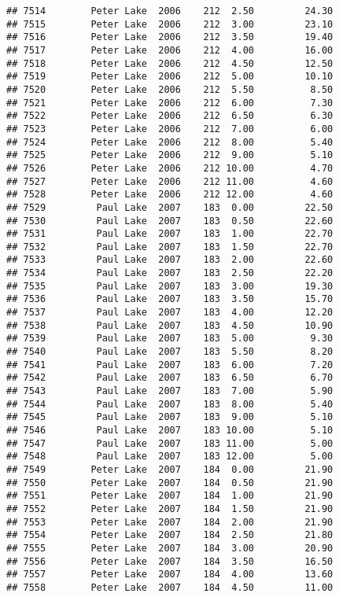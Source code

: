 \documentclass[
]{article}
\begin{document}
\begin{verbatim}
## 7514        Peter Lake  2006    212  2.50         24.30
## 7515        Peter Lake  2006    212  3.00         23.10
## 7516        Peter Lake  2006    212  3.50         19.40
## 7517        Peter Lake  2006    212  4.00         16.00
## 7518        Peter Lake  2006    212  4.50         12.50
## 7519        Peter Lake  2006    212  5.00         10.10
## 7520        Peter Lake  2006    212  5.50          8.50
## 7521        Peter Lake  2006    212  6.00          7.30
## 7522        Peter Lake  2006    212  6.50          6.30
## 7523        Peter Lake  2006    212  7.00          6.00
## 7524        Peter Lake  2006    212  8.00          5.40
## 7525        Peter Lake  2006    212  9.00          5.10
## 7526        Peter Lake  2006    212 10.00          4.70
## 7527        Peter Lake  2006    212 11.00          4.60
## 7528        Peter Lake  2006    212 12.00          4.60
## 7529         Paul Lake  2007    183  0.00         22.50
## 7530         Paul Lake  2007    183  0.50         22.60
## 7531         Paul Lake  2007    183  1.00         22.70
## 7532         Paul Lake  2007    183  1.50         22.70
## 7533         Paul Lake  2007    183  2.00         22.60
## 7534         Paul Lake  2007    183  2.50         22.20
## 7535         Paul Lake  2007    183  3.00         19.30
## 7536         Paul Lake  2007    183  3.50         15.70
## 7537         Paul Lake  2007    183  4.00         12.20
## 7538         Paul Lake  2007    183  4.50         10.90
## 7539         Paul Lake  2007    183  5.00          9.30
## 7540         Paul Lake  2007    183  5.50          8.20
## 7541         Paul Lake  2007    183  6.00          7.20
## 7542         Paul Lake  2007    183  6.50          6.70
## 7543         Paul Lake  2007    183  7.00          5.90
## 7544         Paul Lake  2007    183  8.00          5.40
## 7545         Paul Lake  2007    183  9.00          5.10
## 7546         Paul Lake  2007    183 10.00          5.10
## 7547         Paul Lake  2007    183 11.00          5.00
## 7548         Paul Lake  2007    183 12.00          5.00
## 7549        Peter Lake  2007    184  0.00         21.90
## 7550        Peter Lake  2007    184  0.50         21.90
## 7551        Peter Lake  2007    184  1.00         21.90
## 7552        Peter Lake  2007    184  1.50         21.90
## 7553        Peter Lake  2007    184  2.00         21.90
## 7554        Peter Lake  2007    184  2.50         21.80
## 7555        Peter Lake  2007    184  3.00         20.90
## 7556        Peter Lake  2007    184  3.50         16.50
## 7557        Peter Lake  2007    184  4.00         13.60
## 7558        Peter Lake  2007    184  4.50         11.00

\end{verbatim}
\end{document}
